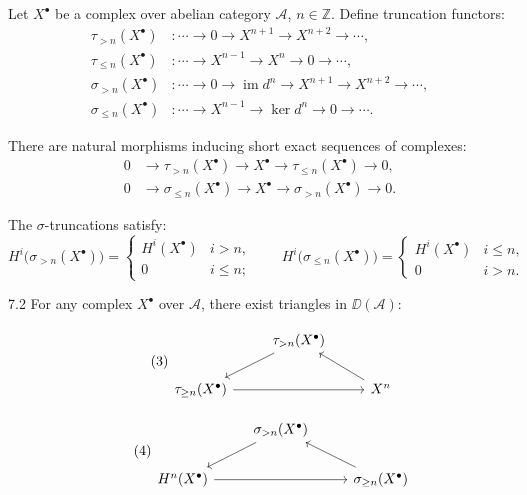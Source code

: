 \begin{definition*}
Let $X^\bullet$ be a complex over abelian category $\mathcal{A}$, $n\in\mathbb{Z}$.
Define truncation functors:
\begin{align*}
\tau_{>n}(X^\bullet)&\colon \cdots\to 0\to X^{n+1}\to X^{n+2}\to\cdots,\\
\tau_{\le n}(X^\bullet)&\colon \cdots\to X^{n-1}\to X^n\to 0\to\cdots,\\
\sigma_{>n}(X^\bullet)&\colon \cdots\to 0\to \operatorname{im}d^n\to X^{n+1}\to X^{n+2}\to\cdots,\\
\sigma_{\le n}(X^\bullet)&\colon \cdots\to X^{n-1}\to \ker d^n\to 0\to\cdots.
\end{align*}

There are natural morphisms inducing short exact sequences of complexes:
\begin{align}
0 &\to \tau_{>n}(X^\bullet) \to X^\bullet \to \tau_{\le n}(X^\bullet) \to 0,\tag{1}\label{eq:1.7.1}\\
0 &\to \sigma_{\le n}(X^\bullet) \to X^\bullet \to \sigma_{>n}(X^\bullet) \to 0.\tag{2}\label{eq:1.7.2}
\end{align}

The $\sigma$-truncations satisfy:
\[
H^i\big(\sigma_{>n}(X^\bullet)\big)
=
\begin{cases}
H^i(X^\bullet) & i>n,\\
0 & i\le n;
\end{cases}
\qquad
H^i\big(\sigma_{\le n}(X^\bullet)\big)
=
\begin{cases}
H^i(X^\bullet) & i\le n,\\
0 & i>n.
\end{cases}
\]
\end{definition*}

\begin{booklemma}{7.2}\label{lem:1.7.2}
For any complex $X^\bullet$ over $\mathcal{A}$, there exist triangles in $\DD(\mathcal{A})$:

\begin{equation}\tag{3}\label{eq:1.7.3}
\begin{tikzcd}
	& \tau_{>n}(X^\bullet) \arrow[ld] & \\
	\tau_{\geq n}(X^\bullet) \arrow[rr] & & X^n\arrow[lu]
\end{tikzcd}
\end{equation}

\vspace{2em}

\begin{equation}\tag{4}\label{eq:1.7.4}
\begin{tikzcd}
	& \sigma_{>n}(X^\bullet) \arrow[ld] & \\
	H^n(X^\bullet) \arrow[rr] & & \sigma_{\geq n}(X^\bullet) \arrow[lu]
\end{tikzcd}
\end{equation}
\end{booklemma}

